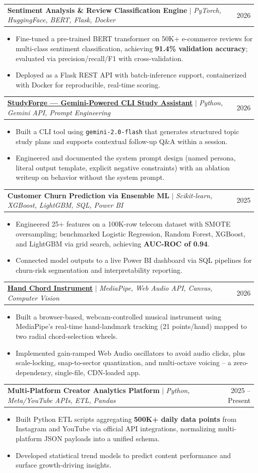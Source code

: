 \documentclass[letterpaper,10.5pt]{article}
\makeatletter
\newcommand{\resumeItem}[1]{
  \item\small{#1 \vspace{-2pt}}
}
\newcommand{\resumeProjectHeading}[2]{
    \item
    \begin{tabular*}{0.97\textwidth}{l@{\extracolsep{\fill}}r}
      \small#1 & \small #2 \\
    \end{tabular*}\vspace{-5pt}
}
\newcommand{\resumeItemListStart}{\begin{itemize}[leftmargin=0.18in]}
\newcommand{\resumeItemListEnd}{\end{itemize}\vspace{-4pt}}
\makeatother
\begin{document}
  \resumeProjectHeading
    {\textbf{Sentiment Analysis \& Review Classification Engine} $|$ \textit{PyTorch, HuggingFace, BERT, Flask, Docker}}{2026}
    \resumeItemListStart
      \resumeItem{Fine-tuned a pre-trained BERT transformer on 50K+ e-commerce reviews for multi-class sentiment classification, achieving \textbf{91.4\% validation accuracy}; evaluated via precision/recall/F1 with cross-validation.}
      \resumeItem{Deployed as a Flask REST API with batch-inference support, containerized with Docker for reproducible, real-time scoring.}
    \resumeItemListEnd

  \resumeProjectHeading
    {\textbf{\href{https://github.com/anujgambhir07/study_assistant}{StudyForge --- Gemini-Powered CLI Study Assistant}} $|$ \textit{Python, Gemini API, Prompt Engineering}}{2026}
    \resumeItemListStart
      \resumeItem{Built a CLI tool using \texttt{gemini-2.0-flash} that generates structured topic study plans and supports contextual follow-up Q\&A within a session.}
      \resumeItem{Engineered and documented the system prompt design (named persona, literal output template, explicit negative constraints) with an ablation writeup on behavior without the system prompt.}
    \resumeItemListEnd

  \resumeProjectHeading
    {\textbf{Customer Churn Prediction via Ensemble ML} $|$ \textit{Scikit-learn, XGBoost, LightGBM, SQL, Power BI}}{2025}
    \resumeItemListStart
      \resumeItem{Engineered 25+ features on a 100K-row telecom dataset with SMOTE oversampling; benchmarked Logistic Regression, Random Forest, XGBoost, and LightGBM via grid search, achieving \textbf{AUC-ROC of 0.94}.}
      \resumeItem{Connected model outputs to a live Power BI dashboard via SQL pipelines for churn-risk segmentation and interpretability reporting.}
    \resumeItemListEnd

  \resumeProjectHeading
    {\textbf{\href{https://github.com/anujgambhir07/hand-chord-instrument}{Hand Chord Instrument}} $|$ \textit{MediaPipe, Web Audio API, Canvas, Computer Vision}}{2026}
    \resumeItemListStart
      \resumeItem{Built a browser-based, webcam-controlled musical instrument using MediaPipe's real-time hand-landmark tracking (21 points/hand) mapped to two radial chord-selection wheels.}
      \resumeItem{Implemented gain-ramped Web Audio oscillators to avoid audio clicks, plus scale-locking, snap-to-sector quantization, and multi-octave voicing -- a zero-dependency, single-file, CDN-loaded app.}
    \resumeItemListEnd

  \resumeProjectHeading
    {\textbf{Multi-Platform Creator Analytics Platform} $|$ \textit{Python, Meta/YouTube APIs, ETL, Pandas}}{2025 -- Present}
    \resumeItemListStart
      \resumeItem{Built Python ETL scripts aggregating \textbf{500K+ daily data points} from Instagram and YouTube via official API integrations, normalizing multi-platform JSON payloads into a unified schema.}
      \resumeItem{Developed statistical trend models to predict content performance and surface growth-driving insights.}
    \resumeItemListEnd
\end{document}
